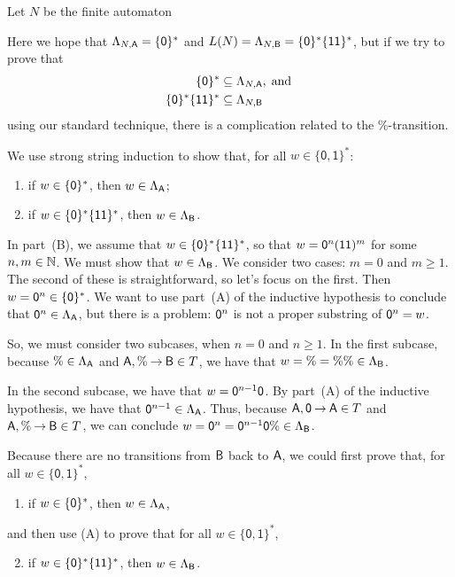 Let $N$ be the finite automaton
\begin{center}

\end{center}
Here we hope that $\Lambda_{N,\mathsf{A}} = {\{\mathsf{0}\}^*}$ and $L(N) =
\Lambda_{N,\mathsf{B}} = \{\mathsf{0}\}^*\{\mathsf{1}\mathsf{1}\}^*$, but if we try to
prove that
\begin{align*}
  \{\mathsf{0}\}^*&\subseteq\Lambda_{N,\mathsf{A}} , \;\allowbreak\mbox{and}\allowbreak\;\\
  \{\mathsf{0}\}^*\{\mathsf{1}\mathsf{1}\}^*&\subseteq\Lambda_{N,\mathsf{B}}
\end{align*}
using our standard technique, there is a complication related to the
$\%$-transition.

We use strong string induction to show that, for all
$w\in\{\mathsf{0,1}\}^*$:
\begin{enumerate}[\quad(A)]
\item if $w\in\{\mathsf{0}\}^*$, then $w\in\Lambda_{\mathsf{A}}$; 

\item if $w\in\{\mathsf{0}\}^*\{\mathsf{1}\mathsf{1}\}^*$, then
  $w\in\Lambda_{\mathsf{B}}$.
\end{enumerate}

In part~(B), we assume that $w\in\{\mathsf{0}\}^*\{\mathsf{1}\mathsf{1}\}^*$, so
that $w=\mathsf{0}^n(\mathsf{1}\mathsf{1})^m$ for some $n,m\in\mathbb{N}$.  We must show that
$w\in\Lambda_{\mathsf{B}}$.  We consider two cases: $m=0$ and $m\geq 1$.
The second of these is straightforward, so let's focus on the first.
Then $w=\mathsf{0}^n\in\{\mathsf{0}\}^*$.  We want to use part~(A) of
the inductive hypothesis to conclude that $\mathsf{0}^n\in\Lambda_{\mathsf{A}}$,
but there is a problem: $\mathsf{0}^n$ is not a proper substring of
$\mathsf{0}^n=w$.

So, we must consider two subcases, when $n=0$ and $n\geq 1$.
In the first subcase, because $\%\in\Lambda_{\mathsf{A}}$ and $\mathsf{A},\%\mathbin{\to}\mathsf{B}\in T$,
we have that $w=\%=\%\%\in\Lambda_{\mathsf{B}}$.

In the second subcase, we have that $w=\mathsf{0}^{n-1}\mathsf{0}$.  By
part~(A) of the inductive hypothesis, we have that
$\mathsf{0}^{n-1}\in\Lambda_{\mathsf{A}}$.  Thus, because
$\mathsf{A},\mathsf{0}\mathbin{\to}\mathsf{A}\in T$ and $\mathsf{A},\%\mathbin{\to}\mathsf{B}\in T$, we can conclude
$w=\mathsf{0}^n=\mathsf{0}^{n-1}\mathsf{0}\%\in\Lambda_{\mathsf{B}}$.

Because there are no transitions from $\mathsf{B}$ back to $\mathsf{A}$, we
could first prove that, for all $w\in\{\mathsf{0,1}\}^*$,
\begin{enumerate}[\quad(A)]
\item if $w\in\{\mathsf{0}\}^*$, then $w\in\Lambda_{\mathsf{A}}$,
\end{enumerate}
and then use (A) to prove that for all $w\in\{\mathsf{0,1}\}^*$,
\begin{enumerate}[\quad(A)]
\setcounter{enumi}{1}
\item if $w\in\{\mathsf{0}\}^*\{\mathsf{1}\mathsf{1}\}^*$, then
$w\in\Lambda_{\mathsf{B}}$.
\end{enumerate}

